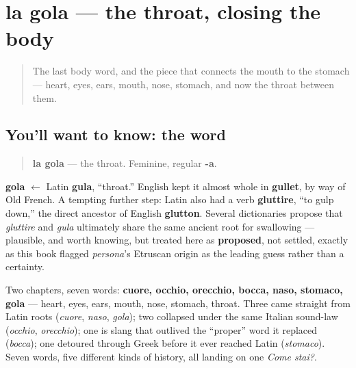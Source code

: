 \section[la gola]{la gola — the throat, closing the body}

\label{lesson:IT-C25-gola}



\begin{quote}
The last body word, and the piece that connects the mouth to the stomach — heart, eyes, ears, mouth, nose, stomach, and now the throat between them.
\end{quote}

\subsection*{You'll want to know: the word}
\begin{quote}
\textbf{la gola} — the throat. Feminine, regular \textbf{-a}.
\end{quote}

\begin{cousinweb}
\textbf{gola} $\leftarrow$ Latin \textbf{gula}, \textquotedblleft{}throat.\textquotedblright{} English kept it almost whole in \textbf{gullet}, by way of Old French. A tempting further step: Latin also had a verb \textbf{gluttire}, \textquotedblleft{}to gulp down,\textquotedblright{} the direct ancestor of English \textbf{glutton}. Several dictionaries propose that \emph{gluttire} and \emph{gula} ultimately share the same ancient root for swallowing — plausible, and worth knowing, but treated here as \textbf{proposed}, not settled, exactly as this book flagged \emph{persona}'s Etruscan origin as the leading guess rather than a certainty.
\end{cousinweb}

\begin{grammarlens}[title={What you've built this chapter}]
Two chapters, seven words: \textbf{cuore, occhio, orecchio, bocca, naso, stomaco, gola} — heart, eyes, ears, mouth, nose, stomach, throat. Three came straight from Latin roots (\emph{cuore}, \emph{naso}, \emph{gola}); two collapsed under the same Italian sound-law (\emph{occhio}, \emph{orecchio}); one is slang that outlived the \textquotedblleft{}proper\textquotedblright{} word it replaced (\emph{bocca}); one detoured through Greek before it ever reached Latin (\emph{stomaco}). Seven words, five different kinds of history, all landing on one \emph{Come stai?}.
\end{grammarlens}

